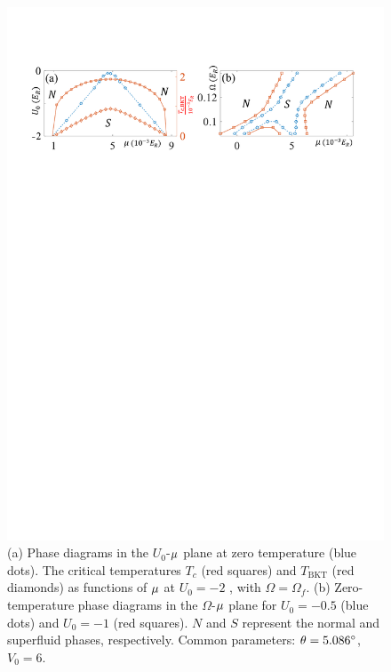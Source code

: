 \documentclass[twocolumn,english,prl,floatfix,citeautoscript,nofootinbib]{revtex4}
\begin{document}
\begin{figure}[tb]
\includegraphics[width=1.0\linewidth]{Fig3_rr_S.pdf}
\caption{(a) Phase diagrams in the $U_{0}$-$\protect\mu $ plane at zero
temperature (blue dots). The critical temperatures $T_{c}$ (red squares) and
$T_{\text{BKT}}$ (red diamonds) as functions of $\protect\mu $ at $U_{0}=-2$%
, with $\Omega =\Omega _{f}$. (b) Zero-temperature phase diagrams in the $%
\Omega $-$\protect\mu $ plane for $U_{0}=-0.5$ (blue dots) and $U_{0}=-1$ (red
squares). $N$ and $S$ represent the normal and superfluid phases,
respectively.
Common parameters: $\protect\theta =5.086^{\circ }$, $V_{0}=6$.}
\label{fig:phase}
\end{figure}
\end{document}

